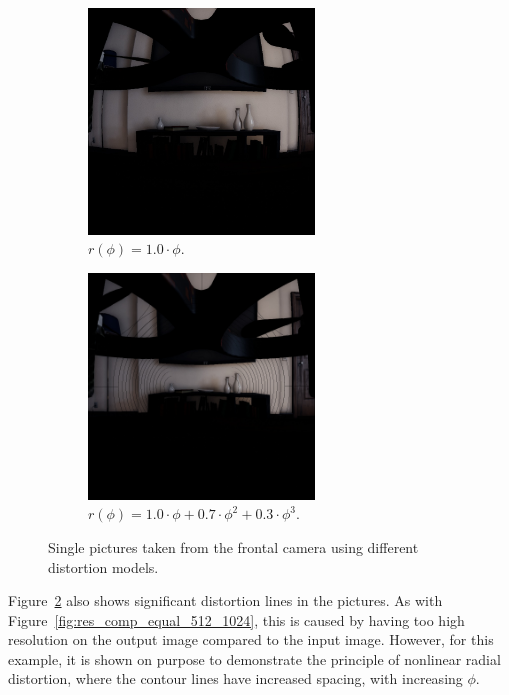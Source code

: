 \begin{figure}[!htb]
    \centering
    \begin{subfigure}{0.45\textwidth}
        \centering
        \includegraphics[height=6cm]{rapport/fig/Results/single/single_equi_distort_noline.jpeg}
        \caption{$r(\phi) = 1.0 \cdot \phi$.}
        \label{fig:res_different_distortion_k1}
    \end{subfigure}
    \begin{subfigure}{0.45\textwidth}
        \centering
        \includegraphics[height=6cm]{rapport/fig/Results/single/single_k2_distort.jpeg}
        \caption{$r(\phi) = 1.0 \cdot \phi + 0.7 \cdot \phi^2 + 0.3 \cdot \phi^3$.}
        \label{fig:res_different_distortion_k1k2k3}
    \end{subfigure}
    \caption{Single pictures taken from the frontal camera using different distortion models.}
    \label{fig:res_different_distortions}
\end{figure}

Figure~\ref{fig:res_different_distortion_k1k2k3} also shows significant distortion lines in the pictures. As with Figure~\ref{fig:res_comp_equal_512_1024}, this is caused by having too high resolution on the output image compared to the input image. However, for this example, it is shown on purpose to demonstrate the principle of nonlinear radial distortion, where the contour lines have increased spacing, with increasing $\phi$.

